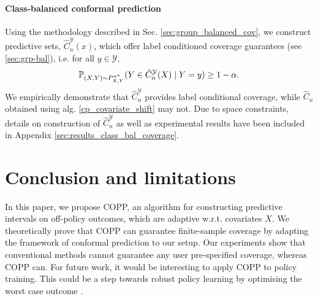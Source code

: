 

\paragraph{Class-balanced conformal prediction}
Using the methodology described in Sec. \ref{sec:group_balanced_cov}, we construct predictive sets, $\hat{C}^{\mathcal{Y}}_n(x)$, which offer label conditioned coverage guarantees (see \ref{sec:grp-bal}), i.e. for all $y\in \mathcal{Y}$, 
$$
\mathbb{P}_{(X,Y)\sim P^{\pi^*}_{X,Y}}(Y \in \hat{C}^{\mathcal{Y}}_n(X) \mid Y = y) \geq 1- \alpha.
$$
We empirically demonstrate that $\hat{C}^{\mathcal{Y}}_n$ provides label conditional coverage, while $\hat{C}_n$ obtained using alg. \ref{cp_covariate_shift} may not. Due to space constraints, details on construction of $\hat{C}^{\mathcal{Y}}_n$ as well as experimental results have been included in Appendix \ref{sec:results_class_bal_coverage}.

\section{Conclusion and limitations}\label{sec:lims}

In this paper, we propose COPP, an algorithm for constructing predictive intervals on off-policy outcomes, which are adaptive w.r.t. covariates $X$. We theoretically prove that COPP can guarantee finite-sample coverage by adapting the framework of conformal prediction to our setup.
Our experiments show that conventional methods cannot guarantee any user pre-specified coverage, whereas COPP can.
For future work, it would be interesting to apply COPP to policy training. This could be a step towards robust policy learning by optimising the worst case outcome \citep{stutz2021learning}.

